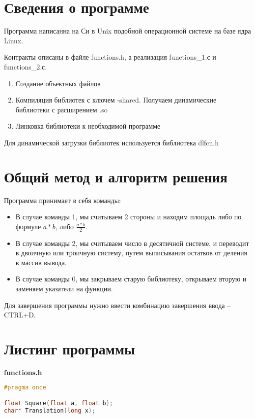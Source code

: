 \documentclass[pdf, unicode, 12pt, a4paper,oneside,fleqn]{article}
\begin{document}
\section{Сведения о программе}

Программа написанна на Си в Unix подобной операционной системе на базе ядра Linux.

Контракты описаны в файле functions.h, а реализация functions\_1.с и functions\_2.с.

\begin{enumerate}
    \item Создание объектных файлов
    \item Компиляция библиотек с ключем -shared. Получаем динамические библиотеки с расширением .so 
    \item Линковка библиотеки к необходимой программе
\end{enumerate}

Для динамической загрузки библиотек используется библиотека dlfcn.h

\section{Общий метод и алгоритм решения}

Программа принимает в себя команды: 
\begin{itemize}
    \item В случае команды 1, мы считываем 2 стороны и находим площадь либо по формуле $a*b$, либо $\frac{a*b}{2}$.
    \item В случае команды 2, мы считываем число в десятичной системе, и переводит в двоичную или троичную систему, путем выписывания остатков от деления в массив вывода.
    \item В случае команды 0, мы закрываем старую библиотеку, открываем вторую и заменяем указатели на функции.
\end{itemize}

Для завершения программы нужно ввести комбинацию завершения ввода \--- CTRL+D.

\section{Листинг программы}

{\large\textbf{functions.h}}

\begin{lstlisting}[language=C]
#pragma once

float Square(float a, float b);
char* Translation(long x);
\end{lstlisting}
\end{document}
